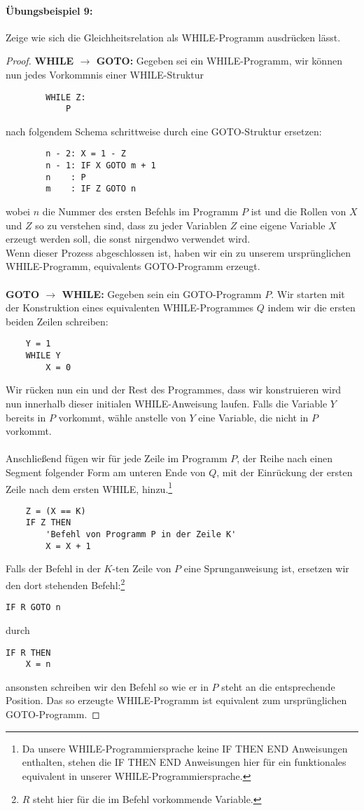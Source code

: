 \documentclass[11pt,a4paper,leqno]{report}
\numberwithin{equation}{chapter}
\begin{document}
\paragraph{Übungsbeispiel 9:} Zeige wie sich die Gleichheitsrelation als WHILE-Programm ausdrücken lässt.
\begin{proof}
\textbf{WHILE $\rightarrow$ GOTO:} Gegeben sei ein WHILE-Programm, wir können nun jedes Vorkommnis einer WHILE-Struktur
\begin{lstlisting}
		WHILE Z:
			P 
\end{lstlisting}
nach folgendem Schema schrittweise durch eine GOTO-Struktur ersetzen:
\begin{lstlisting}
		n - 2: X = 1 - Z
		n - 1: IF X GOTO m + 1
		n    : P
		m    : IF Z GOTO n
\end{lstlisting}
wobei $n$ die Nummer des ersten Befehls im Programm $P$ ist und die Rollen von $X$ und $Z$ so zu verstehen sind, dass zu jeder Variablen $Z$ eine eigene Variable $X$ erzeugt werden soll, die sonst nirgendwo verwendet wird.\\
Wenn dieser Prozess abgeschlossen ist, haben wir ein zu unserem ursprünglichen WHILE-Programm, equivalents GOTO-Programm erzeugt.
\\
\\
\textbf{GOTO $\rightarrow$ WHILE:} Gegeben sein ein GOTO-Programm $P$. Wir starten mit der Konstruktion eines equivalenten WHILE-Programmes $Q$ indem wir die ersten beiden Zeilen schreiben:
\begin{lstlisting}
	Y = 1
	WHILE Y
		X = 0
\end{lstlisting}
Wir rücken nun ein und der Rest des Programmes, dass wir konstruieren wird nun innerhalb dieser initialen WHILE-Anweisung laufen. Falls die Variable $Y$ bereits in $P$ vorkommt, wähle anstelle von $Y$ eine Variable, die nicht in $P$ vorkommt.\\
\\
Anschließend fügen wir für jede Zeile im Programm $P$, der Reihe nach einen Segment folgender Form am unteren Ende von $Q$, mit der Einrückung der ersten Zeile nach dem ersten WHILE, hinzu.\footnote{Da unsere WHILE-Programmiersprache keine IF THEN END Anweisungen enthalten, stehen die IF THEN END Anweisungen hier für ein funktionales equivalent in unserer WHILE-Programmiersprache.}
\begin{lstlisting}
	Z = (X == K)
	IF Z THEN
		'Befehl von Programm P in der Zeile K'
		X = X + 1
\end{lstlisting}
Falls der Befehl in der $K$-ten Zeile von $P$ eine Sprunganweisung ist, ersetzen wir den dort stehenden Befehl:\footnote{$R$ steht hier für die im Befehl vorkommende Variable.}
\begin{lstlisting}
IF R GOTO n
\end{lstlisting}
durch
\begin{lstlisting}
IF R THEN
	X = n
\end{lstlisting}
ansonsten schreiben wir den Befehl so wie er in $P$ steht an die entsprechende Position. Das so erzeugte WHILE-Programm ist equivalent zum ursprünglichen GOTO-Programm.
\end{proof}
\end{document}
